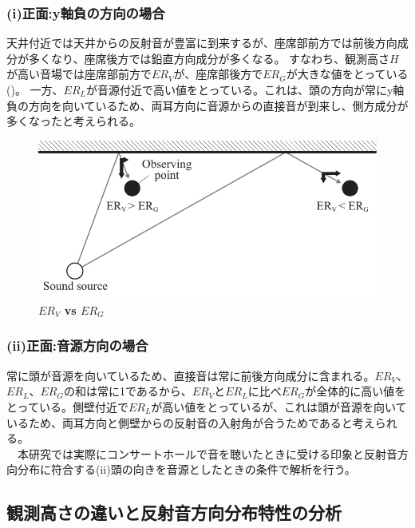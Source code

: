 


\subsubsection{(i)正面:y軸負の方向の場合}
天井付近では天井からの反射音が豊富に到来するが、座席部前方では前後方向成分が多くなり、座席後方では鉛直方向成分が多くなる。
すなわち、観測高さ$H$が高い音場では座席部前方で$ER_V$が、座席部後方で$ER_G$が大きな値をとっている()。
一方、$ER_L$が音源付近で高い値をとっている。これは、頭の方向が常にy軸負の方向を向いているため、両耳方向に音源からの直接音が到来し、側方成分が多くなったと考えられる。
\\
\begin{figure}[htbp]
    \centering
    \includegraphics[keepaspectratio,scale=1]{05_att/er_reason.pdf}
    \caption{\hspace{1mm}\textbf{$ER_V$ vs $ER_G$}}
    \label{fig:er_reason}
\end{figure}

\subsubsection{(ii)正面:音源方向の場合}
常に頭が音源を向いているため、直接音は常に前後方向成分に含まれる。$ER_V$、$ER_L$、$ER_G$の和は常に1であるから、$ER_V$と$ER_L$に比べ$ER_G$が全体的に高い値をとっている。側壁付近で$ER_L$が高い値をとっているが、これは頭が音源を向いているため、両耳方向と側壁からの反射音の入射角が合うためであると考えられる。
\\　本研究では実際にコンサートホールで音を聴いたときに受ける印象と反射音方向分布に符合する(ii)頭の向きを音源としたときの条件で解析を行う。
\pagebreak

\subsection{観測高さの違いと反射音方向分布特性の分析}




